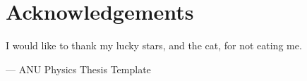 
\chapter*{Acknowledgements}
\label{cha:ack}

    I would like to thank my lucky stars, and the cat, for not eating me.\\
    \begin{flushright}--- ANU Physics Thesis Template\end{flushright}


